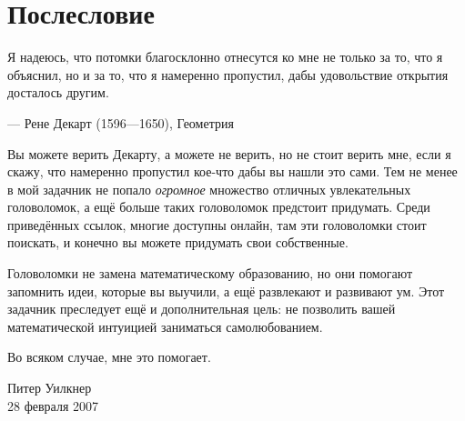 \chapter{Послесловие}


\setlength{\epigraphwidth}{.83\textwidth}
\epigraph{Я надеюсь, что потомки благосклонно отнесутся ко мне не только за то, что я объяснил, но и за то, что я намеренно пропустил, дабы удовольствие открытия досталось другим.}{--- Рене Декарт (1596---1650), Геометрия}


Вы можете верить Декарту, а можете не верить, но не стоит верить мне, если я скажу, что намеренно пропустил кое-что дабы вы нашли это сами.
Тем не менее в мой задачник не попало \emph{огромное} множество отличных увлекательных головоломок, а ещё больше таких головоломок предстоит придумать.
Среди приведённых ссылок, многие доступны онлайн, там эти головоломки стоит поискать,
и конечно вы можете придумать свои собственные.

Головоломки не замена математическому образованию, но они помогают запомнить идеи, которые вы выучили, а ещё развлекают и развивают ум.
Этот задачник преследует ещё и дополнительная цель:
не позволить вашей математической интуицией заниматься самолюбованием.

Во всяком случае, мне это помогает.

\begin{flushright}
Питер Уилкнер\\
28 февраля 2007
\end{flushright}
